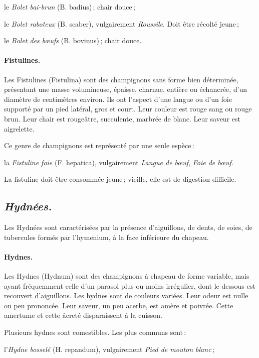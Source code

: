 le \textit{Bolet bai-brun} (B. badius) ; chair douce ;

le \textit{Bolet raboteux} (B. scaber), vulgairement \textit{Roussile}. Doit
être récolté jeune ;

le \textit{Bolet des bœufs} (B. bovinus) ; chair douce.

\paragraph{Fistulines.}

Les Fistulines (Fistulina) sont des champignons sans forme bien déterminée,
présentant une masse volumineuse, épaisse, charnue, entière ou échancrée, d'un
diamètre de {\mmm} centimètres environ. Ils ont l'aspect d'une langue ou
d'un foie supporté par un pied latéral, gros et court. Leur couleur est rouge
sang ou rouge brun. Leur chair est rougeâtre, succulente, marbrée de blanc.
Leur saveur est aigrelette.

Ce genre de champignons est représenté par une seule espèce :

la \textit{Fistuline foie} (F. hepatica), vulgairement \textit{Langue de bœuf},
\textit{Foie de bœuf.}

La fistuline doit être consommée jeune ; vieille, elle est de digestion difficile.

\subsection*{\centering \textit{Hydnées.}} 

Les Hydnées sont caractérisées par la présence d'aiguillons, de dents, de
soies, de tubercules formés par l'hymenium, à la face inférieure du chapeau.

\paragraph{Hydnes.}

Les Hydnes (Hydnum) sont des champignons à chapeau de forme variable,
mais ayant fréquemment celle d'un parasol plus ou moins irrégulier, dont le
dessous est recouvert d'aiguillons. Les hydnes sont de couleurs variées. Leur
odeur est nulle ou peu prononcée. Leur saveur, un peu acerbe, est amère et
poivrée. Cette amertume et cette âcreté disparaissent à la cuisson.

Plusieurs hydnes sont comestibles. Les plus communs sont :

l'\textit{Hydne bosselé} (H. repandum), vulgairement \textit{Pied de mouton
blanc} ;

